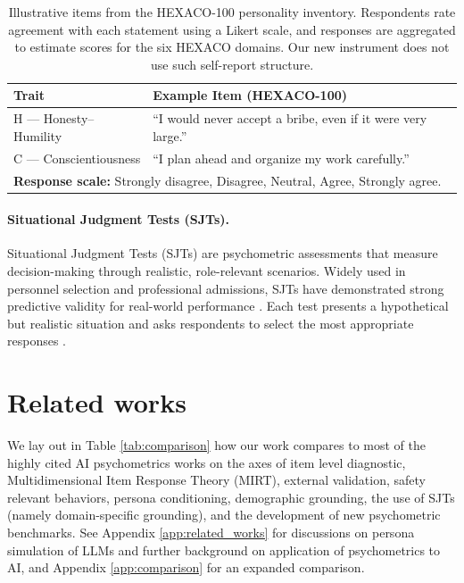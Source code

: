 \documentclass[11pt]{article}
\begin{document}
\begin{table}[t]
\centering
\small
\begin{tabular}{p{3cm} p{9.5cm}}
\toprule
\textbf{Trait} & \textbf{Example Item (HEXACO-100)} \\
\midrule

\textcolor{hexH}{H — Honesty–Humility} &
``I would never accept a bribe, even if it were very large.'' \\

\textcolor{hexC}{C — Conscientiousness} &
``I plan ahead and organize my work carefully.'' \\

\midrule
\multicolumn{2}{p{12.5cm}}{\textbf{Response scale:} 
Strongly disagree, Disagree, Neutral, Agree, Strongly agree.} \\

\bottomrule
\end{tabular}
\caption{Illustrative items from the HEXACO-100 personality inventory. 
Respondents rate agreement with each statement using a Likert scale, and 
responses are aggregated to estimate scores for the six HEXACO domains. Our new instrument does not use such self-report structure.}
\label{tab:hexaco_example_items}
\end{table}

\paragraph{Situational Judgment Tests (SJTs).}
Situational Judgment Tests (SJTs) are psychometric assessments that measure decision-making through realistic, role-relevant scenarios. Widely used in personnel selection and professional admissions, SJTs have demonstrated strong predictive validity for real-world performance \cite{lievens2016situational}. Each test presents a hypothetical but realistic situation and asks respondents to select the most appropriate responses \cite{weekley2015low}. 

\section{Related works}
\label{sec:related_works}
We lay out in Table \ref{tab:comparison} how our work compares to most of the highly cited AI psychometrics works on the axes of item level diagnostic, Multidimensional Item Response Theory (MIRT), external validation, safety relevant behaviors, persona conditioning, demographic grounding, the use of SJTs (namely domain-specific grounding), and the development of new psychometric benchmarks. See Appendix \ref{app:related_works} for discussions on persona simulation of LLMs and further background on application of psychometrics to AI, and Appendix \ref{app:comparison} for an expanded comparison.
\end{document}
